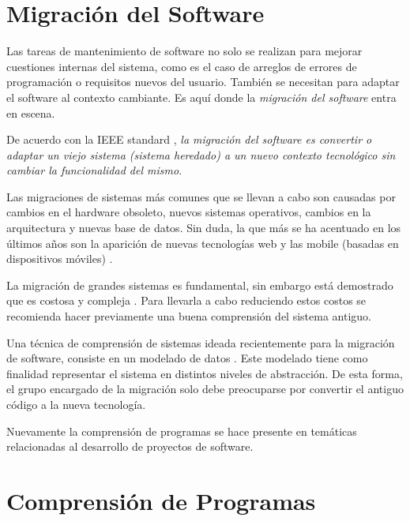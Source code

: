 

\section{Migración del Software}

Las tareas de mantenimiento de software no solo se realizan para mejorar cuestiones internas del sistema, como es el caso de arreglos de errores de programación o requisitos nuevos del usuario. También se necesitan para adaptar el software al contexto cambiante. Es aquí donde la \textit{migración del software} entra en escena.
 
De acuerdo con la IEEE standard \cite{STD1219}, \textit{la migración del software es convertir o adaptar un viejo sistema (sistema heredado) a un nuevo contexto tecnológico sin cambiar la funcionalidad del mismo}.

Las migraciones de sistemas más comunes que se llevan a cabo son causadas por cambios en el hardware obsoleto, nuevos sistemas operativos, cambios en la arquitectura y nuevas base de datos. Sin duda, la que más se ha acentuado en los últimos años son la aparición de nuevas tecnologías web y las mobile (basadas en dispositivos móviles) \cite{MMFAF08}.
 
La migración de grandes sistemas es fundamental, sin embargo está demostrado que es costosa y compleja \cite{MMFAF08}. Para llevarla a cabo reduciendo estos costos se recomienda hacer previamente una buena comprensión del sistema antiguo. 

Una técnica de comprensión de sistemas ideada recientemente para la migración de software, consiste en un mode\-lado de datos \cite{WHAFVR11}. Este modelado tiene como finalidad representar el sistema en distintos niveles de abstracción. De esta forma, el grupo encargado de la migración solo debe preocuparse por convertir el antiguo código a la nueva tecnología.

Nuevamente la comprensión de programas se hace presente en temáticas relacionadas al desarrollo de proyectos de software.

\section{Comprensión de Programas}

